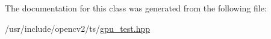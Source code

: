 The documentation for this class was generated from the following file\-:\begin{DoxyCompactItemize}
\item 
/usr/include/opencv2/ts/\hyperlink{gpu__test_8hpp}{gpu\-\_\-test.\-hpp}\end{DoxyCompactItemize}

